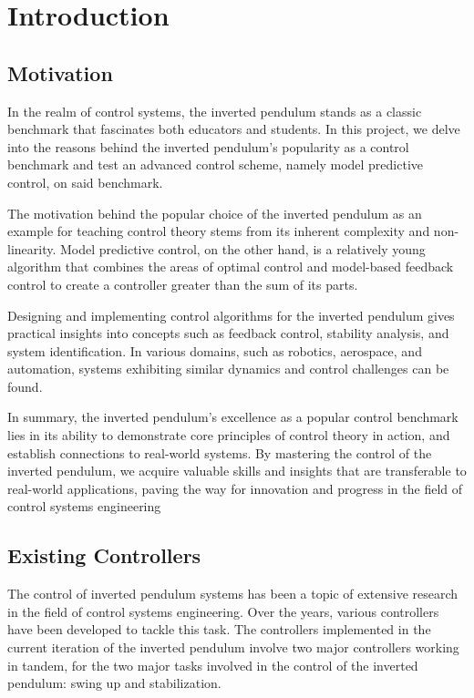 \chapter{Introduction}
\label{cha:intro}


\section{Motivation}

In the realm of control systems, the inverted pendulum stands as a classic benchmark that fascinates both educators and students. In this project, we delve into the reasons behind the inverted pendulum's popularity as a control benchmark and test an advanced control scheme, namely model predictive control, on said benchmark.

The motivation behind the popular choice of the inverted pendulum as an example for teaching control theory stems from its inherent complexity and non-linearity. Model predictive control, on the other hand, is a relatively young algorithm that combines the areas of optimal control and model-based feedback control to create a controller greater than the sum of its parts. 

Designing and implementing control algorithms for the inverted pendulum gives practical insights into concepts such as feedback control, stability analysis, and system identification. In various domains, such as robotics, aerospace, and automation, systems exhibiting similar dynamics and control challenges can be found.

In summary, the inverted pendulum's excellence as a popular control benchmark lies in its ability to demonstrate core principles of control theory in action, and establish connections to real-world systems. By mastering the control of the inverted pendulum, we acquire valuable skills and insights that are transferable to real-world applications, paving the way for innovation and progress in the field of control systems engineering

\section{Existing Controllers}
The control of inverted pendulum systems has been a topic of extensive research in the field of control systems engineering. Over the years, various controllers have been developed to tackle this task. The controllers implemented in the current iteration of the inverted pendulum involve two major controllers working in tandem, for the two major tasks involved in the control of the inverted pendulum: swing up and stabilization.

